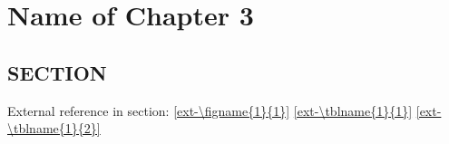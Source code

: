 \documentclass[../main/main]{subfiles}
\begin{document}
\chapter{Name of Chapter 3}
\label{chapter3}

\section{SECTION}
\lipsum[5-7]

\cite{smit54,colu92,gree00,phil99,jame76}

External reference in section:
\ref{ext-\figname{1}{1}}
\ref{ext-\tblname{1}{1}}
\ref{ext-\tblname{1}{2}}

\printbibliography[title=References]

\end{document}
